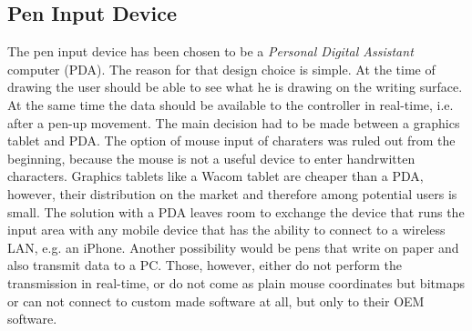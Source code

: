 \subsection{Pen Input Device}
\label{sec:peninputdevice}

The pen input device has been chosen to be a \emph{Personal Digital Assistant} 
computer (PDA). The reason for that design choice is simple. At the time of
drawing the user should be able to see what he is drawing on the writing surface.
At the same time the data should be available to the controller in real-time,
i.e. after a pen-up movement.
The main decision had to be made between a graphics tablet and PDA.
The option of mouse input of charaters was ruled out from the beginning,
because the mouse is not a useful device to enter handrwitten characters.
Graphics tablets like a Wacom tablet are cheaper than a PDA, however,
their distribution on the market and therefore among potential users is small.
The solution with a PDA leaves room to exchange the device that runs the input
area with any mobile device that has the ability to connect to a wireless LAN,
e.g. an iPhone.
Another possibility would be pens that write on paper and also transmit data
to a PC. Those, however, either do not perform the transmission in real-time,
or do not come as plain mouse coordinates but bitmaps or can not connect to
custom made software at all, but only to their OEM software.

